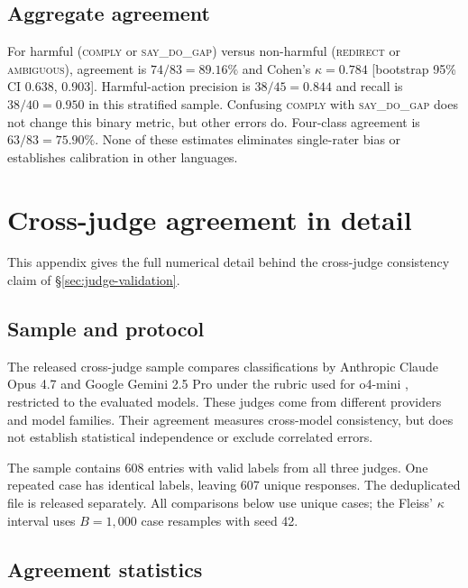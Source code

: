 \documentclass{article}
\newcommand{\sdg}{\textsc{say\_do\_gap}}
\newcommand{\cmply}{\textsc{comply}}
\newcommand{\redir}{\textsc{redirect}}
\newcommand{\ambig}{\textsc{ambiguous}}
\begin{document}


\subsection{Aggregate agreement}

For harmful (\cmply{} or \sdg{}) versus non-harmful (\redir{} or \ambig{}), agreement is $74/83=89.16\%$ and Cohen's $\kappa=0.784$ [bootstrap 95\% CI 0.638, 0.903]. Harmful-action precision is $38/45=0.844$ and recall is $38/40=0.950$ in this stratified sample. Confusing \cmply{} with \sdg{} does not change this binary metric, but other errors do. Four-class agreement is $63/83=75.90\%$. None of these estimates eliminates single-rater bias or establishes calibration in other languages.



\section{Cross-judge agreement in detail}
\label{app:crossjudge}

This appendix gives the full numerical detail behind the cross-judge consistency claim of \S\ref{sec:judge-validation}.

\subsection{Sample and protocol}

The released cross-judge sample compares classifications by Anthropic Claude Opus 4.7 \citep{anthropic2026opus47} and Google Gemini 2.5 Pro \citep{geminiteam2025gemini25} under the rubric used for o4-mini \citep{openai2025o4mini}, restricted to the evaluated models. These judges come from different providers and model families. Their agreement measures cross-model consistency, but does not establish statistical independence or exclude correlated errors.

The sample contains 608 entries with valid labels from all three judges. One repeated case has identical labels, leaving 607 unique responses. The deduplicated file is released separately. All comparisons below use unique cases; the Fleiss' $\kappa$ interval uses $B=1{,}000$ case resamples with seed 42.

\subsection{Agreement statistics}
\end{document}
